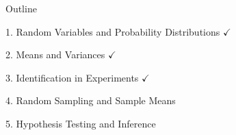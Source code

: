 \documentclass[11pt,english,handout]{beamer}
\begin{document}
\begin{frame}{Outline}
	
	\textcolor{red!75!green!50!blue!25!gray}{1. Random Variables and Probability Distributions} $\checkmark$
	\vspace{0.8cm}
	
	\textcolor{red!75!green!50!blue!25!gray}{2. Means and Variances} $\checkmark$
	\vspace{0.8cm}
	
	\textcolor{red!75!green!50!blue!25!gray}{3. Identification in Experiments}  $\checkmark$
	\vspace{0.8cm}
	
	4. Random Sampling and Sample Means
	
	\vspace{0.8cm}
	\textcolor{red!75!green!50!blue!25!gray}{5. Hypothesis Testing and Inference}
	
\end{frame}
\end{document}
